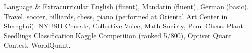 \begin{rubric}{Language \& Extracurricular}
\entry*[Languages]
	English (fluent), Mandarin (fluent), German (basic).
\entry*[Hobbies]
	Travel, soccer, billiards, chess, piano (performed at Oriental Art Center in Shanghai).
\entry*[Clubs]
	NYUSH Chorale, Collective Voice, Math Society, Penn Chess.
\entry*[Activities]
	Plant Seedlings Classification Kaggle Competition (ranked 5/800), Optiver Quant Contest, WorldQuant.
\end{rubric}

